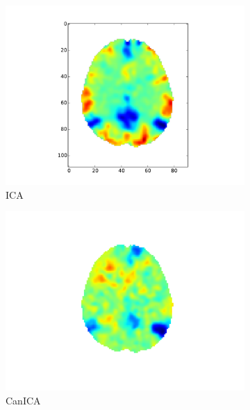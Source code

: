 \documentclass{frontiersSCNS} %
\begin{document}
\begin{figure}[hbtp]
  \begin{center}
      \begin{subfigure}[b]{.3\linewidth}
        \includegraphics[width=\linewidth]{img/ica/ica}
        \caption{ICA}
      \end{subfigure}
      \begin{subfigure}[b]{.3\linewidth}
        \includegraphics[width=\linewidth]{img/ica/canica}
        \caption{CanICA}
      \end{subfigure}
      \begin{subfigure}[b]{.3\linewidth}

\end{subfigure}
\end{center}
\end{figure}
\end{document}
